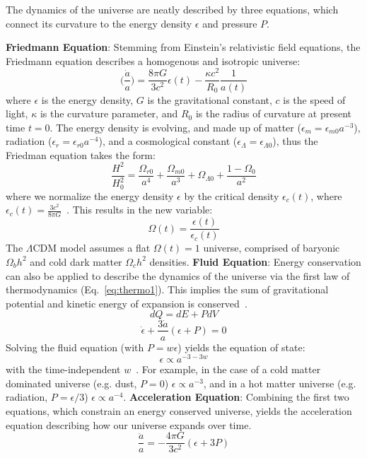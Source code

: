 The dynamics of the universe are neatly described by three equations, which connect its curvature to the energy density $\epsilon$ and pressure $P$.

\noindent
\textbf{Friedmann Equation}:  Stemming from Einstein's relativistic field equations, the Friedmann equation describes a homogenous and isotropic universe:  
\begin{equation}
    \bigg ( \frac{\Dot{a}}{a} \bigg ) = \frac{8\pi G}{3c^2}\epsilon(t) - \frac{\kappa c^2}{R_0}\frac{1}{a(t)}
\end{equation}
where $\epsilon$ is the energy density, $G$ is the gravitational constant, $c$ is the speed of light, $\kappa$ is the curvature parameter, and $R_0$ is the radius of curvature at present time $t=0$.  The energy density is evolving, and made up of matter ($\epsilon_m=\epsilon_{m0}a^{-3}$), radiation ($\epsilon_r=\epsilon_{r0}a^{-4}$), and a cosmological constant ($\epsilon_{\Lambda}=\epsilon_{\Lambda 0}$), thus the Friedman equation takes the form:
\begin{equation}
    \frac{H^2}{H_0^2} = \frac{\Omega_{r0}}{a^4} + \frac{\Omega_{m0}}{a^3} + \Omega_{\Lambda 0} + \frac{1-\Omega_0}{a^2}
\end{equation}
where we normalize the energy density $\epsilon$ by the critical density $\epsilon_c(t)$, where $\epsilon_c(t) = \frac{3c^2}{8\pi G}$~\cite{ryden_2016}.  This results in the new variable:
\begin{equation}
    \Omega(t) = \frac{\epsilon(t)}{\epsilon_c(t)}
\end{equation}
The $\Lambda$CDM model assumes a flat $\Omega(t)=1$ universe, comprised of baryonic $\Omega_b h^2$ and cold dark matter $\Omega_c h^2$ densities.
\noindent
\textbf{Fluid Equation}:  Energy conservation can also be applied to describe the dynamics of the universe via the first law of thermodynamics (Eq.~\ref{eq:thermo1}).  This implies the sum of gravitational potential and kinetic energy of expansion is conserved~\cite{ryden_2016}.
\begin{equation}
    dQ = dE + PdV
    \label{eq:thermo1}
\end{equation}
\begin{equation}
    \dot{\epsilon} + \frac{3\dot{a}}{a}(\epsilon + P) = 0
    \label{eq:fluid_universe}
\end{equation}
\noindent
Solving the fluid equation (with $P=w\epsilon$) yields the equation of state:
\begin{equation}
    \epsilon \propto a^{-3-3w}
\end{equation}
with the time-independent $w$~\cite{weinberg_cosmo}.  For example, in the case of a cold matter dominated universe (e.g. dust, $P = 0$) $\epsilon\propto a^{-3}$, and in a hot matter universe (e.g. radiation, $P=\epsilon/3$) $\epsilon\propto a^{-4}$.
\noindent
\textbf{Acceleration Equation}: Combining the first two equations, which constrain an energy conserved universe, yields the acceleration equation describing how our universe expands over time.  
\begin{equation}
    \frac{\ddot{a}}{a} = - \frac{4\pi G}{3 c^2} (\epsilon + 3 P)
\end{equation}
